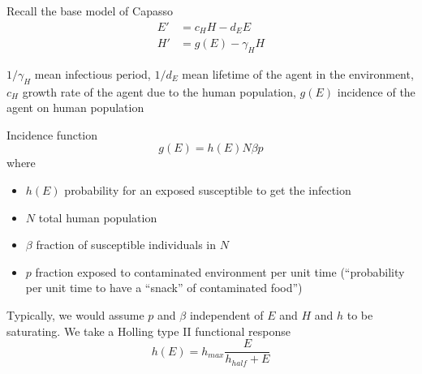 \documentclass[aspectratio=169]{beamer}
\begin{document}
\begin{frame}{Recall the base model of Capasso}
  \begin{subequations}
    \label{sys:capasso_EH}
    \begin{align}
      E' &= c_HH-d_EE \label{sys:capasso_EH_dE} \\
      H' &= g(E)-\gamma_HH \label{sys:capasso_EH_dH}
    \end{align}
  \end{subequations}
  \begin{center}
    \def\vertskip{*1.75}
    \def\horzskip{*2}
  \end{center}
  $1/\gamma_H$ mean infectious period, $1/d_E$ mean lifetime of the agent in the environment, $c_H$ growth rate of the agent due to the human population, $g(E)$ incidence of the agent on human population
\end{frame}

\begin{frame}{Incidence function}
  \begin{equation}
    \label{eq:incidence_function_Capasso}
    g(E) = h(E)N\beta p
  \end{equation}
  where
  \begin{itemize}
    \item $h(E)$ probability for an exposed susceptible to get the infection
    \item $N$ total human population
    \item $\beta$ fraction of susceptible individuals in $N$
    \item $p$ fraction exposed to contaminated environment per unit time (``probability per unit time to have a ``snack'' of contaminated food'')
  \end{itemize}
  Typically, we would assume $p$ and $\beta$ independent of $E$ and $H$ and $h$ to be saturating. We take a Holling type II functional response
  \begin{equation}
    h(E)=h_{max}\frac{E}{h_{half}+E}
  \end{equation}
\end{frame}
\end{document}
